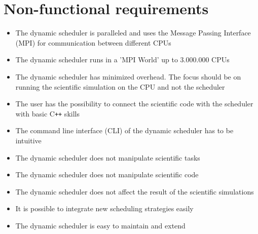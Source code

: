 {
\setcounter{funcNFR}{10}
\renewcommand{\labelitemi}{
	\ifnum \value{funcNFR}<10$/NF 0\arabic{funcNFR} /$\addtocounter{funcNFR}{10}
	\else $/NF \arabic{funcNFR} /$\addtocounter{funcNFR}{10}\fi
}

\section{Non-functional requirements}
	\begin{itemize}
		\item The dynamic scheduler is paralleled and uses the Message Passing Interface (MPI) for communication between different CPUs
		\item The dynamic scheduler runs in a 'MPI World' up to 3.000.000 CPUs
		\item The dynamic scheduler has minimized overhead. The focus should be on running the scientific simulation on the CPU and not the scheduler
		\item The user has the possibility to connect the scientific code with the scheduler with basic C\texttt{++} skills%
		\item The command line interface (CLI) of the dynamic scheduler has to be intuitive
		\item The dynamic scheduler does not manipulate scientific tasks
		\item The dynamic scheduler does not manipulate scientific code
		\item The dynamic scheduler does not affect the result of the scientific simulations
		\item It is possible to integrate new scheduling strategies easily
		\item The dynamic scheduler is easy to maintain and extend
	\end{itemize}
}